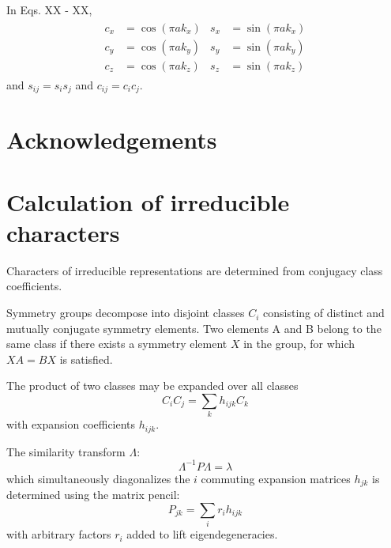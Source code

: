 \documentclass[preprint,showpacs,preprintnumbers,superscriptaddress,prb,floatfix,aps]{revtex4-1}
\begin{document}
In Eqs. XX - XX,
\begin{align}
\begin{split}
c_x &= \cos(\pi a k_x) \\
c_y &= \cos(\pi a k_y) \\
c_z &= \cos(\pi a k_z)
\end{split}
\begin{split}
s_x &= \sin(\pi a k_x) \\
s_y &= \sin(\pi a k_y) \\
s_z &= \sin(\pi a k_z)
\end{split}
\end{align}
and
$s_{ij} = s_i s_j$ and $c_{ij} = c_i c_j$.



\section{Acknowledgements}



\clearpage

\appendix


\section{Calculation of irreducible characters}

Characters of irreducible representations are determined from conjugacy class coefficients\cite{burnside_theory_2010,mckay_construction_1970,unger_computing_2006,schneider_dixons_1990,dixon_high_1967}.

Symmetry groups decompose into disjoint classes $C_i$ consisting of distinct and mutually conjugate symmetry elements. Two elements A and B belong to the same class if there exists a symmetry element $X$ in the group, for which $XA = BX$ is satisfied.

The product of two classes may be expanded over all classes
\begin{equation}
\label{eq:class_coefficients}
C_i C_j = \sum_k h_{ijk} C_k
\end{equation}
with expansion coefficients $h_{ijk}$.

The similarity transform $\Lambda$:
\begin{equation}
\Lambda^{-1} P \Lambda = \lambda
\end{equation}
which simultaneously diagonalizes the $i$ commuting expansion matrices $h_{jk}$ is determined using the matrix pencil:
\begin{equation}
\label{eq:matrix_pencil}
P_{jk} = \sum_i r_i h_{ijk}
\end{equation}
with arbitrary factors $r_i$ added to lift eigendegeneracies.
\end{document}
